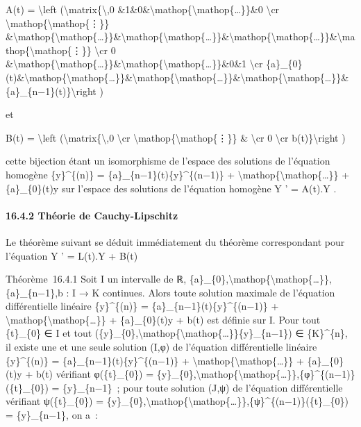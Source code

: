 \documentclass[]{article}
\begin{document}
A(t) = \textbackslash{}left (\textbackslash{}matrix\{\textbackslash{},0
\&1\&0\&\textbackslash{}mathop\{\textbackslash{}mathop\{\ldots{}\}\}\&0
\textbackslash{}cr \textbackslash{}mathop\{\textbackslash{}mathop\{⋮\}\}
\&\textbackslash{}mathop\{\textbackslash{}mathop\{\ldots{}\}\}\&\textbackslash{}mathop\{\textbackslash{}mathop\{\ldots{}\}\}\&\textbackslash{}mathop\{\textbackslash{}mathop\{\ldots{}\}\}\&\textbackslash{}mathop\{\textbackslash{}mathop\{⋮\}\}
\textbackslash{}cr 0
\&\textbackslash{}mathop\{\textbackslash{}mathop\{\ldots{}\}\}\&\textbackslash{}mathop\{\textbackslash{}mathop\{\ldots{}\}\}\&0\&1
\textbackslash{}cr
\{a\}\_\{0\}(t)\&\textbackslash{}mathop\{\textbackslash{}mathop\{\ldots{}\}\}\&\textbackslash{}mathop\{\textbackslash{}mathop\{\ldots{}\}\}\&\textbackslash{}mathop\{\textbackslash{}mathop\{\ldots{}\}\}\&\{a\}\_\{n−1\}(t)\}\textbackslash{}right
)

et

B(t) = \textbackslash{}left (\textbackslash{}matrix\{\textbackslash{},0
\textbackslash{}cr \textbackslash{}mathop\{\textbackslash{}mathop\{⋮\}\}
\& \textbackslash{}cr 0 \textbackslash{}cr b(t)\}\textbackslash{}right )

cette bijection étant un isomorphisme de l'espace des solutions de
l'équation homogène \{y\}\^{}\{(n)\} =
\{a\}\_\{n−1\}(t)\{y\}\^{}\{(n−1)\} +
\textbackslash{}mathop\{\textbackslash{}mathop\{\ldots{}\}\} +
\{a\}\_\{0\}(t)y sur l'espace des solutions de l'équation homogène Y ' =
A(t).Y .

\paragraph{16.4.2 Théorie de Cauchy-Lipschitz}

Le théorème suivant se déduit immédiatement du théorème correspondant
pour l'équation Y ' = L(t).Y + B(t)

Théorème~16.4.1 Soit I un intervalle de ℝ,
\{a\}\_\{0\},\textbackslash{}mathop\{\textbackslash{}mathop\{\ldots{}\}\},\{a\}\_\{n−1\},b
: I → K continues. Alors toute solution maximale de l'équation
différentielle linéaire \{y\}\^{}\{(n)\} =
\{a\}\_\{n−1\}(t)\{y\}\^{}\{(n−1)\} +
\textbackslash{}mathop\{\textbackslash{}mathop\{\ldots{}\}\} +
\{a\}\_\{0\}(t)y + b(t) est définie sur I. Pour tout \{t\}\_\{0\} ∈ I et
tout
(\{y\}\_\{0\},\textbackslash{}mathop\{\textbackslash{}mathop\{\ldots{}\}\}\{y\}\_\{n−1\})
∈ \{K\}\^{}\{n\}, il existe une et une seule solution (I,φ) de
l'équation différentielle linéaire \{y\}\^{}\{(n)\} =
\{a\}\_\{n−1\}(t)\{y\}\^{}\{(n−1)\} +
\textbackslash{}mathop\{\textbackslash{}mathop\{\ldots{}\}\} +
\{a\}\_\{0\}(t)y + b(t) vérifiant φ(\{t\}\_\{0\}) =
\{y\}\_\{0\},\textbackslash{}mathop\{\textbackslash{}mathop\{\ldots{}\}\},\{φ\}\^{}\{(n−1)\}(\{t\}\_\{0\})
= \{y\}\_\{n−1\}~; pour toute solution (J,ψ) de l'équation
différentielle vérifiant ψ(\{t\}\_\{0\}) =
\{y\}\_\{0\},\textbackslash{}mathop\{\textbackslash{}mathop\{\ldots{}\}\},\{ψ\}\^{}\{(n−1)\}(\{t\}\_\{0\})
= \{y\}\_\{n−1\}, on a~:
\end{document}
